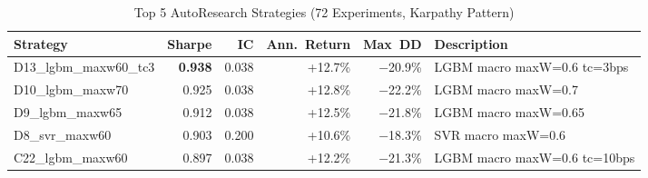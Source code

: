 \begin{table}
\caption{Top 5 AutoResearch Strategies (72 Experiments, Karpathy Pattern)}
\label{tab:autoresearch_top5}
\begin{tabular}{lrrrrl}
\toprule
Strategy & Sharpe & IC & Ann.~Return & Max~DD & Description \\
\midrule
D13\_lgbm\_maxw60\_tc3 & \textbf{0.938} & 0.038 & +12.7\% & $-$20.9\% & LGBM macro maxW=0.6 tc=3bps \\
D10\_lgbm\_maxw70 & 0.925 & 0.038 & +12.8\% & $-$22.2\% & LGBM macro maxW=0.7 \\
D9\_lgbm\_maxw65 & 0.912 & 0.038 & +12.5\% & $-$21.8\% & LGBM macro maxW=0.65 \\
D8\_svr\_maxw60 & 0.903 & 0.200 & +10.6\% & $-$18.3\% & SVR macro maxW=0.6 \\
C22\_lgbm\_maxw60 & 0.897 & 0.038 & +12.2\% & $-$21.3\% & LGBM macro maxW=0.6 tc=10bps \\
\bottomrule
\end{tabular}
\end{table}
